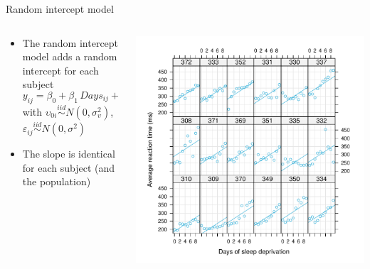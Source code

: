 \documentclass[aspectratio=169]{beamer}
\begin{document}
\begin{frame}{Random intercept model}
  \begin{columns}
    \begin{column}{.5\textwidth}
  \begin{itemize}
\item The random intercept model adds a random intercept for each subject
\[
  y_{ij} = \beta_0 + \beta_1\,Days_{ij} + \upsilon_{0i} + \varepsilon_i
\]
with $\upsilon_{0i} \overset{iid}{\sim} N(0, \sigma^2_{\upsilon})$,
      $\varepsilon_{ij} \overset{iid}{\sim} N(0, \sigma^2)$
    \item The slope is identical for each subject (and the population)
  \end{itemize}
      \vspace{2.2cm}
    \end{column}
    \begin{column}{.5\textwidth}
      \includegraphics[scale=.5]{fig/sleep_random_intercept}
    \end{column}
  \end{columns}
\end{frame}

\end{document}
